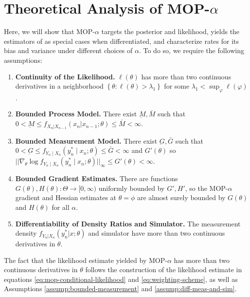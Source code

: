 \documentclass[9pt,twocolumn,twoside]{pnas-new}
\begin{document}
\section{Theoretical Analysis of MOP-$\alpha$}
\label{sec:thms}

Here, we will show that MOP-$\alpha$ targets the posterior and likelihood, yields the estimators of \cite{poyiadjis11, scibior21, blei2018vsmc} as special cases when differentiated, and characterize rates for its bias and variance under different choices of $\alpha$. To do so, we require the following assumptions:

\begin{enumerate}[label=(A\arabic*),itemsep=-1.2ex] 
    \item \textbf{Continuity of the Likelihood.} $\ell(\theta)$ has more than two continuous derivatives in a neighborhood $\left\{\theta: \ell(\theta)>\lambda_1\right\}$ for some $\lambda_1<\sup _{\varphi} \ell(\varphi)$. \label{assump:conti-lik}
    \item \textbf{Bounded Process Model.} There exist $\underbar{M}, \bar{M}$ such that $0 < \underbar{M} \leq f_{X_n|X_{n-1}}(x_n | x_{n-1};\theta) \leq \bar{M} < \infty$. \label{assump:bounded-process}
    \item \textbf{Bounded Measurement Model.} There exist $\underbar{G}, \bar{G}$ such that $0<\underbar{G} \leq f_{Y_n \mid X_n}\left(y_n^* \mid x_n; \theta\right) \leq \bar{G}<\infty$ and $G'(\theta)$ so $||\nabla_\theta \log f_{Y_n \mid X_n}\left(y_n^* \mid x_n; \theta\right)||_\infty \leq G'(\theta)< \infty$. \label{assump:bounded-measurement}
    \item \textbf{Bounded Gradient Estimates.} There are functions $G(\theta), H(\theta): \Theta \to [0,\infty)$ uniformly bounded by $G', H'$, so the MOP-$\alpha$ gradient and Hessian estimates at $\theta=\phi$ are almost surely bounded by $G(\theta)$ and $H(\theta)$ for all $\alpha$. \label{assump:local-bounded-derivative}
    \item \textbf{Differentiability of Density Ratios and Simulator.} The measurement density $f_{Y_n|X_n}(y_n^*|x; \theta)$ and simulator have more than two continuous derivatives in $\theta$. \label{assump:diff-meas-and-sim}
\end{enumerate}

The fact that the likelihood estimate yielded by MOP-$\alpha$ has more than two continuous derivatives in $\theta$ follows the construction of the likelihood estimate in equations \ref{eq:mop-conditional-likelihood} and \ref{eq:weighting-scheme}, as well as Assumptions \ref{assump:bounded-measurement} and \ref{assump:diff-meas-and-sim}. 
\end{document}
